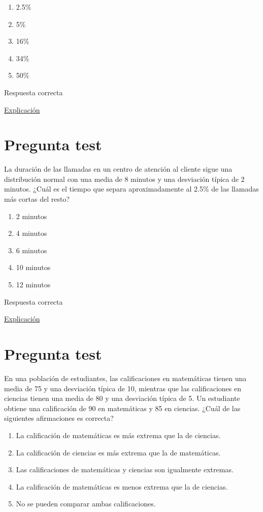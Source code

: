 \documentclass[
]{book}
\providecommand{\tightlist}{%
  \setlength{\itemsep}{0pt}\setlength{\parskip}{0pt}}
\begin{document}
\begin{enumerate}
\def\labelenumi{\alph{enumi})}
\tightlist
\item
  2.5\%
\item
  5\%
\item
  16\%
\item
  34\%
\item
  50\%
\end{enumerate}

Respuesta correcta

\href{https://homepage.divms.uiowa.edu/~mbognar/applets/normal.html}{Explicación}

\hypertarget{pregunta-test-108}{%
\section{Pregunta test}\label{pregunta-test-108}}

La duración de las llamadas en un centro de atención al cliente sigue una distribución normal con una media de 8 minutos y una desviación típica de 2 minutos. ¿Cuál es el tiempo que separa aproximadamente al 2.5\% de las llamadas más cortas del resto?

\begin{enumerate}
\def\labelenumi{\alph{enumi})}
\tightlist
\item
  2 minutos
\item
  4 minutos
\item
  6 minutos
\item
  10 minutos
\item
  12 minutos
\end{enumerate}

Respuesta correcta

\href{https://homepage.divms.uiowa.edu/~mbognar/applets/normal.html}{Explicación}

\hypertarget{pregunta-test-109}{%
\section{Pregunta test}\label{pregunta-test-109}}

En una población de estudiantes, las calificaciones en matemáticas tienen una media de 75 y una desviación típica de 10, mientras que las calificaciones en ciencias tienen una media de 80 y una desviación típica de 5. Un estudiante obtiene una calificación de 90 en matemáticas y 85 en ciencias. ¿Cuál de las siguientes afirmaciones es correcta?

\begin{enumerate}
\def\labelenumi{\alph{enumi})}
\tightlist
\item
  La calificación de matemáticas es más extrema que la de ciencias.
\item
  La calificación de ciencias es más extrema que la de matemáticas.
\item
  Las calificaciones de matemáticas y ciencias son igualmente extremas.
\item
  La calificación de matemáticas es menos extrema que la de ciencias.
\item
  No se pueden comparar ambas calificaciones.
\end{enumerate}
\end{document}
